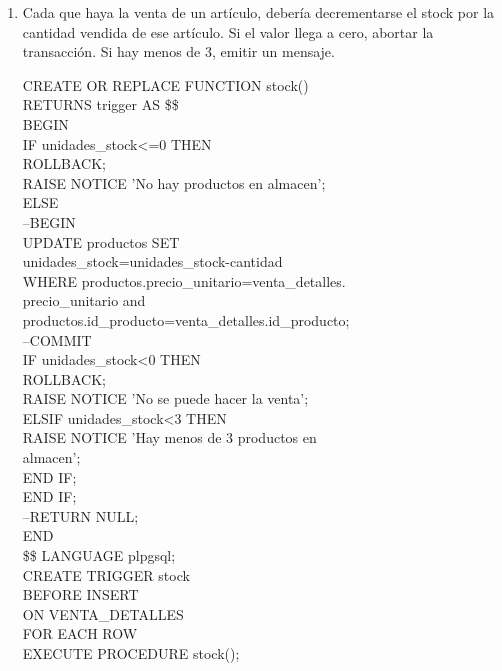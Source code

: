 \documentclass[10pt]{report}
\begin{document}
\begin{enumerate}
\begin{flushleft}
    \end{flushleft}
    
    \item Cada que haya la venta de un artículo, debería decrementarse el stock por la cantidad vendida de ese artículo. Si el valor llega a cero, abortar la transacción. Si hay menos de 3, emitir un mensaje.
    
    \begin{flushleft} \ttfamily
    CREATE OR REPLACE FUNCTION stock()\\
    RETURNS trigger AS \$\$\\
    BEGIN\\
	  IF unidades\_stock<=0 THEN \\
		ROLLBACK;\\	  
		RAISE NOTICE 'No hay productos en almacen';\\
	  ELSE \\
	  	--BEGIN\\
		UPDATE productos SET\\
      	unidades\_stock=unidades\_stock-cantidad\\
      	WHERE productos.precio\_unitario=venta\_detalles.\\
      	precio\_unitario and\\ 
		productos.id\_producto=venta\_detalles.id\_producto;\\
		--COMMIT\\
				IF unidades\_stock<0 THEN\\
					ROLLBACK;\\
					RAISE NOTICE 'No se puede hacer la venta';\\
				ELSIF unidades\_stock<3 THEN \\
					RAISE NOTICE 'Hay menos de 3 productos en\\ almacen';\\
				END IF;\\
       END IF;\\
--RETURN NULL;\\
END\\

\$\$ LANGUAGE plpgsql;\\ 

CREATE TRIGGER stock\\
  BEFORE INSERT\\
  ON VENTA\_DETALLES\\
  FOR EACH ROW\\
  EXECUTE PROCEDURE stock();\\


\end{flushleft}
\end{enumerate}
\end{document}
